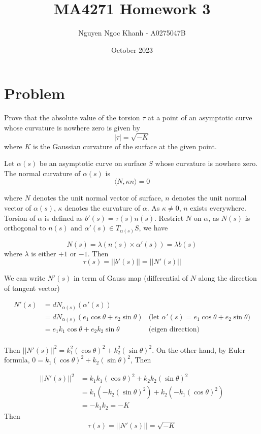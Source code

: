 \documentclass{article}
\title{
    MA4271 Homework 3
}
\author{Nguyen Ngoc Khanh - A0275047B}
\date{October 2023}
\begin{document}
\maketitle

\section{Problem}

\begin{problem}
    Prove that the absolute value of the torsion $\tau$ at a point of an asymptotic curve whose curvature is nowhere zero is given by
    \[
        |\tau| = \sqrt{-K}
    \]
    where $K$ is the Gaussian curvature of the surface at the given point.
\end{problem}

Let $\alpha(s)$ be an asymptotic curve on surface $S$ whose curvature is nowhere zero. The normal curvature of $\alpha(s)$ is 
\[
    \langle N, \kappa n \rangle = 0
\]

where $N$ denotes the unit normal vector of surface, $n$ denotes the unit normal vector of $\alpha(s)$, $\kappa$ denotes the curvature of $\alpha$. As $\kappa \neq 0$, $n$ exists everywhere. Torsion of $\alpha$ is defined as $b'(s) = \tau(s) n(s)$. Restrict $N$ on $\alpha$, as $N(s)$ is orthogonal to $n(s)$ and $\alpha'(s) \in T_{\alpha(s)} S$, we have

\[
    N(s) = \lambda (n(s) \times \alpha'(s)) = \lambda b(s) 
\]
where $\lambda$ is either $+1$ or $-1$. Then 
\[
    \tau(s) = ||b'(s)|| = ||N'(s)||
\]

We can write $N'(s)$ in term of Gauss map (differential of $N$ along the direction of tangent vector)

\begin{align*}
    N'(s)
    &= dN_{\alpha(s)} (\alpha'(s)) \\
    &= dN_{\alpha(s)} (e_1 \cos \theta + e_2 \sin \theta) &\text{(let $\alpha'(s) = e_1 \cos \theta + e_2 \sin \theta$)} \\
    &= e_1 k_1 \cos \theta + e_2 k_2 \sin \theta &\text{(eigen direction)} \\
\end{align*}

Then $||N'(s)||^2 = k_1^2 (\cos \theta)^2 + k_2^2 (\sin \theta)^2$. On the other hand, by Euler formula, $0 = k_1 (\cos \theta)^2 + k_2 (\sin \theta)^2$, Then

\begin{align*}
    ||N'(s)||^2
    &= k_1 k_1 (\cos \theta)^2 + k_2 k_2 (\sin \theta)^2 \\
    &= k_1 (- k_2 (\sin \theta)^2) + k_2 (-k_1 (\cos \theta)^2) \\
    &= - k_1 k_2 = -K
\end{align*}
Then
\[
    \tau(s) = ||N'(s)|| = \sqrt{-K}
\]
\end{document}
